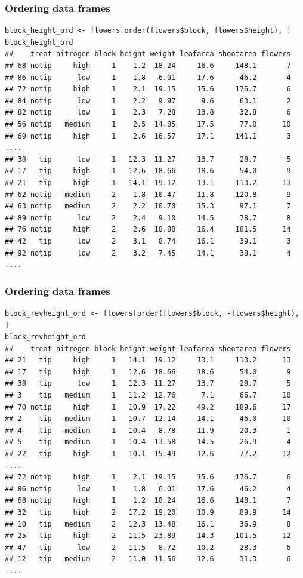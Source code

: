\documentclass{beamer}
\newcommand{\lsting}[1]{\begin{lstlisting}[basicstyle=#1]}
\newcommand{\bfr}[1]{\begin{frame}[fragile]\frametitle{{ #1 }}}
\begin{document}
\bfr{Ordering data frames}
\lsting{\tiny}
block_height_ord <- flowers[order(flowers$block, flowers$height), ]        
block_height_ord
##    treat nitrogen block height weight leafarea shootarea flowers
## 68 notip     high     1    1.2  18.24     16.6     148.1       7
## 86 notip      low     1    1.8   6.01     17.6      46.2       4
## 72 notip     high     1    2.1  19.15     15.6     176.7       6
## 84 notip      low     1    2.2   9.97      9.6      63.1       2
## 82 notip      low     1    2.3   7.28     13.8      32.8       6
## 56 notip   medium     1    2.5  14.85     17.5      77.8      10
## 69 notip     high     1    2.6  16.57     17.1     141.1       3
....
## 38   tip      low     1   12.3  11.27     13.7      28.7       5
## 17   tip     high     1   12.6  18.66     18.6      54.0       9
## 21   tip     high     1   14.1  19.12     13.1     113.2      13
## 62 notip   medium     2    1.8  10.47     11.8     120.8       9
## 63 notip   medium     2    2.2  10.70     15.3      97.1       7
## 89 notip      low     2    2.4   9.10     14.5      78.7       8
## 76 notip     high     2    2.6  18.88     16.4     181.5      14
## 42   tip      low     2    3.1   8.74     16.1      39.1       3
## 92 notip      low     2    3.2   7.45     14.1      38.1       4
....
\end{lstlisting}
\end{frame}




\bfr{Ordering data frames}
\lsting{\tiny}
block_revheight_ord <- flowers[order(flowers$block, -flowers$height), ]        
block_revheight_ord
##    treat nitrogen block height weight leafarea shootarea flowers
## 21   tip     high     1   14.1  19.12     13.1     113.2      13
## 17   tip     high     1   12.6  18.66     18.6      54.0       9
## 38   tip      low     1   12.3  11.27     13.7      28.7       5
## 3    tip   medium     1   11.2  12.76      7.1      66.7      10
## 70 notip     high     1   10.9  17.22     49.2     189.6      17
## 2    tip   medium     1   10.7  12.14     14.1      46.0      10
## 4    tip   medium     1   10.4   8.78     11.9      20.3       1
## 5    tip   medium     1   10.4  13.58     14.5      26.9       4
## 22   tip     high     1   10.1  15.49     12.6      77.2      12
....
## 72 notip     high     1    2.1  19.15     15.6     176.7       6
## 86 notip      low     1    1.8   6.01     17.6      46.2       4
## 68 notip     high     1    1.2  18.24     16.6     148.1       7
## 32   tip     high     2   17.2  19.20     10.9      89.9      14
## 10   tip   medium     2   12.3  13.48     16.1      36.9       8
## 25   tip     high     2   11.5  23.89     14.3     101.5      12
## 47   tip      low     2   11.5   8.72     10.2      28.3       6
## 12   tip   medium     2   11.0  11.56     12.6      31.3       6
....
\end{lstlisting}
\end{frame}
\end{document}
